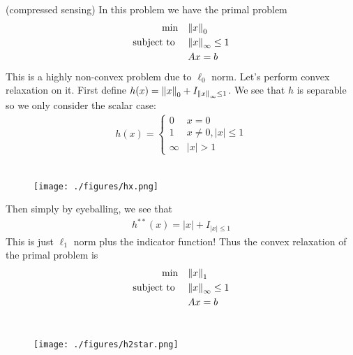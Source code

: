 \documentclass[class=article,crop=false]{standalone}
\begin{document}
\begin{eg}(compressed sensing)
In this problem we have the primal problem
\begin{align*}
\min\quad &{\left\lVert{ x}\right\rVert}_0  \\
\text{subject to } \quad &{\left\lVert{ x}\right\rVert}_{\infty} \leq 1 \\
&Ax=b
\end{align*}
This is a highly non-convex problem due to $ \ell_0$ norm. Let's perform convex relaxation on it. First define $ h(x) = {\left\lVert{ x}\right\rVert}_0 + I_{{\left\lVert{ x}\right\rVert}_{\infty} \leq 1} $. We see that $ h$ is separable so we only consider the scalar case:
\begin{align*}
	h(x)=
	\begin{cases}
		0 & x=0\\
		1 & x\neq 0, |x|\leq 1\\
		\infty & |x|>1
	\end{cases}
\end{align*}
~\begin{figure}[H]
	\centering
	\texttt{[image: ./figures/hx.png]}
\end{figure}

Then simply by eyeballing, we see that
\begin{align*}
	h^{* *}(x) = |x| + I_{|x|\leq 1}
\end{align*}
This is just $ \ell_1$ norm plus the indicator function! Thus the convex relaxation of the primal problem is
\begin{align*}
\min\quad &{\left\lVert{ x}\right\rVert}_1  \\
\text{subject to } \quad &{\left\lVert{ x}\right\rVert}_{\infty} \leq 1 \\
&Ax=b
\end{align*}
~\begin{figure}[H]
	\centering
	\texttt{[image: ./figures/h2star.png]}
\end{figure}
\end{eg}
\end{document}
